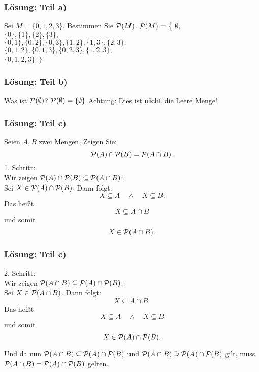 %
%
\begin{frame}\frametitle{Lösung: Teil a)}
Sei $M = \{0,1,2,3\}.$ Bestimmen Sie ${\cal P}(M)$. \pause
\vfill
${\cal P}(M) = \big\{$ \pause				$ \emptyset,$\\  \pause
				\hspace{17mm}$\{0\}, \{1\}, \{2\}, \{3\},$\\ \pause
				\hspace{17mm}$\{0,1\}, \{0,2\}, \{0,3\}, \{1,2\}, \{1,3\}, \{2,3\},$\\  \pause
				\hspace{17mm}$\{0,1,2\}, \{0,1,3\}, \{0,2,3\}, \{1,2,3\},$\\  \pause
				\hspace{17mm}$\{0,1,2,3\}$ \pause$\ \big\}$
%
\end{frame}
%
%
\begin{frame}\frametitle{Lösung: Teil b)}
%
Was ist ${\cal P}(\emptyset)$? \pause
\vfill
${\cal P}(\emptyset) = \{ \emptyset \}$
\vfill
Achtung: Dies ist \textbf{nicht} die Leere Menge!
\end{frame}
%
%
%
\begin{frame}\frametitle{Lösung: Teil c)}
%
Seien $A, B$ zwei Mengen. Zeigen Sie:
			$$
				{\cal P}(A) \cap {\cal P}(B) = {\cal P}(A\cap B).
			$$\pause
1. Schritt:\\ 
			Wir zeigen ${\cal P}(A) \cap {\cal P}(B) \subseteq  {\cal P}(A\cap B)$:\\ \pause
			Sei $X \in {\cal P}(A) \cap {\cal P}(B).$ Dann folgt: \pause
			$$
				X \subseteq A\quad \land \quad X \subseteq B.
			$$\pause
			Das hei{\ss}t
			$$
				X \subseteq A \cap B
			$$\pause
			und somit
			$$
				X \in  {\cal P}(A\cap B).
			$$
			

			

\end{frame}
%
\begin{frame}\frametitle{Lösung: Teil c)}
			2. Schritt:\\
			Wir zeigen $ {\cal P}(A\cap B) \subseteq  {\cal P}(A) \cap {\cal P}(B) $:\\ \pause
			Sei $X \in {\cal P}(A\cap B)$. Dann folgt: \pause
			$$
				X \subseteq A\cap B.
			$$ \pause
			Das hei{\ss}t
			$$
				X \subseteq A \quad \land \quad X \subseteq B
			$$ \pause
			und somit
			$$
				X \in {\cal P}(A) \cap {\cal P}(B).
			$$\pause
			
			Und da nun $ {\cal P}(A\cap B) \subseteq  {\cal P}(A) \cap {\cal P}(B) $ und $ {\cal P}(A\cap B) \supseteq  {\cal P}(A) \cap {\cal P}(B) $ gilt, muss $ {\cal P}(A\cap B) =  {\cal P}(A) \cap {\cal P}(B) $ gelten.

\end{frame}

